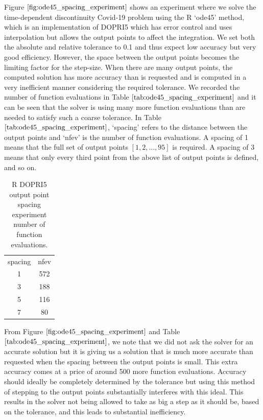 Figure $\ref{fig:ode45_spacing_experiment}$ shows an experiment where we solve the time-dependent discontinuity Covid-19 problem using the R `ode45' method, which is an implementation of DOPRI5 which has error control and uses interpolation but allows the output points to affect the integration. We set both the absolute and relative tolerance to 0.1 and thus expect low accuracy but very good efficiency. However, the space between the output points becomes the limiting factor for the step-size. When there are many output points, the computed solution has more accuracy than is requested and is computed in a very inefficient manner considering the required tolerance. We recorded the number of function evaluations in Table $\ref{tab:ode45_spacing_experiment}$ and it can be seen that the solver is using many more function evaluations than are needed to satisfy such a coarse tolerance. In Table $\ref{tab:ode45_spacing_experiment}$, `spacing' refers to the distance between the output points and `nfev' is the number of function evaluations. A spacing of 1 means that the full set of output points $[1, 2, ..., 95]$ is required. A spacing of 3 means that only every third point from the above list of output points is defined, and so on.

\begin{table}[h]
\caption {R DOPRI5 output point spacing experiment number of function evaluations.} \label{tab:ode45_spacing_experiment} 
\begin{center}
\begin{tabular}{ c c }
spacing & nfev \\ 
1 & 572 \\
3 & 188 \\
5 & 116 \\
7 & 80 \\
\end{tabular}
\end{center}
\end{table}

From Figure $\ref{fig:ode45_spacing_experiment}$ and Table $\ref{tab:ode45_spacing_experiment}$, we note that we did not ask the solver for an accurate solution but it is giving us a solution that is much more accurate than requested when the spacing between the output points is small. This extra accuracy comes at a price of around 500 more function evaluations. Accuracy should ideally be completely determined by the tolerance but using this method of stepping to the output points substantially interferes with this ideal. This results in the solver not being allowed to take as big a step as it should be, based on the tolerance, and this leads to substantial inefficiency. 

